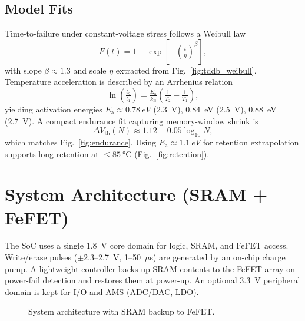 \documentclass[conference]{IEEEtran}
\newcommand{\Vth}{V_{\mathrm{th}}}
\newcommand{\Ea}{E_{\mathrm{a}}}
\newcommand{\betaW}{\beta} %
\newcommand{\etaW}{\eta}   %
\newcommand{\kB}{k_{\mathrm{B}}} %
\begin{document}
\subsection{Model Fits}
Time-to-failure under constant-voltage stress follows a Weibull law
\begin{equation}
  F(t)=1-\exp\!\left[-\left(\tfrac{t}{\etaW}\right)^{\betaW}\right],
  \label{eq:weibull}
\end{equation}
with slope $\betaW \approx 1.3$ and scale $\etaW$ extracted from Fig.~\ref{fig:tddb_weibull}.
Temperature acceleration is described by an Arrhenius relation
\begin{equation}
  \ln\!\left(\tfrac{t_2}{t_1}\right)=\tfrac{\Ea}{\kB}\!\left(\tfrac{1}{T_2}-\tfrac{1}{T_1}\right),
  \label{eq:arrhenius}
\end{equation}
yielding activation energies $\Ea \approx \SI{0.78}{eV}$ (2.3~V), \SI{0.84}{eV} (2.5~V), \SI{0.88}{eV} (2.7~V).
A compact endurance fit capturing memory-window shrink is
\begin{equation}
  \Delta \Vth(N) \approx 1.12 - 0.05\log_{10} N,
  \label{eq:endurance}
\end{equation}
which matches Fig.~\ref{fig:endurance}.
Using $\Ea \approx \SI{1.1}{eV}$ for retention extrapolation supports long retention at $\le \SI{85}{\celsius}$ (Fig.~\ref{fig:retention}).

\section{System Architecture (SRAM + FeFET)}

The SoC uses a single 1.8~V core domain for logic, SRAM, and FeFET access.
Write/erase pulses ($\pm$2.3--2.7~V, 1--50~$\mu$s) are generated by an on-chip charge pump.
A lightweight controller backs up SRAM contents to the FeFET array on power-fail detection and restores them at power-up.
An optional 3.3~V peripheral domain is kept for I/O and AMS (ADC/DAC, LDO).

\begin{figure}[!t]
  \centering
  \caption{System architecture with SRAM backup to FeFET.}
  \label{fig:system}
\end{figure}
\end{document}
